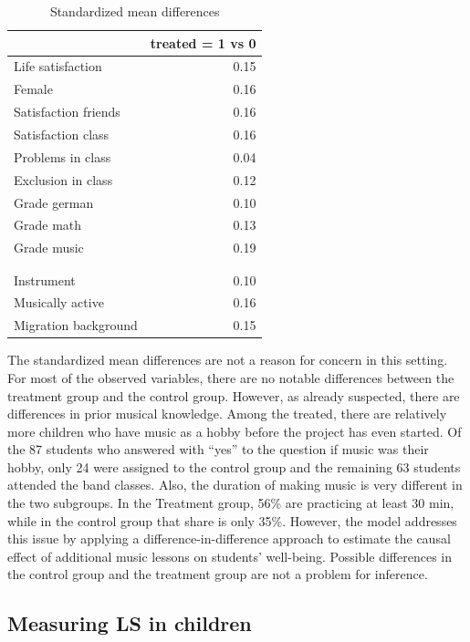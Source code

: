 \documentclass[a4, 12pt]{article}
\begin{document}
\begin{table}[H]

\caption{\label{tab:std-mean-diff}Standardized mean differences}
\centering
\begin{tabular}[t]{lr}
\toprule
  & treated = 1 vs 0\\
\midrule
Life satisfaction & 0.15\\
Female & 0.16\\
Satisfaction friends & 0.16\\
Satisfaction class & 0.16\\
Problems in class & 0.04\\
\addlinespace
Exclusion in class & 0.12\\
Grade german & 0.10\\
Grade math & 0.13\\
Grade music & 0.19\\
\cellcolor[HTML]{cce5ff}{Hobby music} & \cellcolor[HTML]{cce5ff}{0.54}\\
\addlinespace
\cellcolor[HTML]{cce5ff}{Duration music} & \cellcolor[HTML]{cce5ff}{0.45}\\
Instrument & 0.10\\
Musically active & 0.16\\
Migration background & 0.15\\
\bottomrule
\end{tabular}
\end{table}

The standardized mean differences are not a reason for concern in this setting. For most of the observed variables, there are no notable differences between the treatment group and the control group. However, as already suspected, there are differences in prior musical knowledge. Among the treated, there are relatively more children who have music as a hobby before the project has even started. Of the 87 students who answered with ``yes'' to the question if music was their hobby, only 24 were assigned to the control group and the remaining 63 students attended the band classes. Also, the duration of making music is very different in the two subgroups. In the Treatment group, 56\% are practicing at least 30 min, while in the control group that share is only 35\%. However, the model addresses this issue by applying a difference-in-difference approach to estimate the causal effect of additional music lessons on students' well-being. Possible differences in the control group and the treatment group are not a problem for inference.

\hypertarget{measuring-ls-in-children}{%
\subsection{Measuring LS in children}\label{measuring-ls-in-children}}
\end{document}
